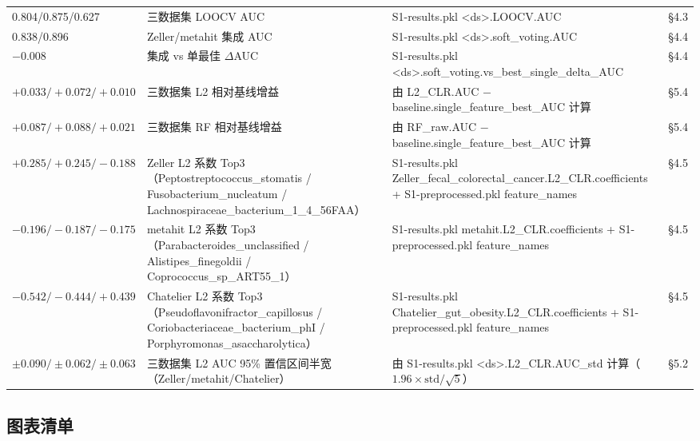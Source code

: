 \documentclass{article}
\begin{document}
\begin{center}
\begin{tabular}{llll}
0.804/0.875/0.627 & 三数据集 LOOCV AUC & S1-results.pkl <ds>.LOOCV.AUC & §4.3 \\
0.838/0.896 & Zeller/metahit 集成 AUC & S1-results.pkl <ds>.soft\_voting.AUC & §4.4 \\
$-0.008$ & 集成 vs 单最佳 $\Delta$AUC & S1-results.pkl <ds>.soft\_voting.vs\_best\_single\_delta\_AUC & §4.4 \\
$+0.033/+0.072/+0.010$ & 三数据集 L2 相对基线增益 & 由 L2\_CLR.AUC $-$ baseline.single\_feature\_best\_AUC 计算 & §5.4 \\
$+0.087/+0.088/+0.021$ & 三数据集 RF 相对基线增益 & 由 RF\_raw.AUC $-$ baseline.single\_feature\_best\_AUC 计算 & §5.4 \\
$+0.285/+0.245/-0.188$ & Zeller L2 系数 Top3（Peptostreptococcus\_stomatis / Fusobacterium\_nucleatum / Lachnospiraceae\_bacterium\_1\_4\_56FAA） & S1-results.pkl Zeller\_fecal\_colorectal\_cancer.L2\_CLR.coefficients + S1-preprocessed.pkl feature\_names & §4.5 \\
$-0.196/-0.187/-0.175$ & metahit L2 系数 Top3（Parabacteroides\_unclassified / Alistipes\_finegoldii / Coprococcus\_sp\_ART55\_1） & S1-results.pkl metahit.L2\_CLR.coefficients + S1-preprocessed.pkl feature\_names & §4.5 \\
$-0.542/-0.444/+0.439$ & Chatelier L2 系数 Top3（Pseudoflavonifractor\_capillosus / Coriobacteriaceae\_bacterium\_phI / Porphyromonas\_asaccharolytica） & S1-results.pkl Chatelier\_gut\_obesity.L2\_CLR.coefficients + S1-preprocessed.pkl feature\_names & §4.5 \\
$\pm0.090/\pm0.062/\pm0.063$ & 三数据集 L2 AUC 95\% 置信区间半宽（Zeller/metahit/Chatelier） & 由 S1-results.pkl <ds>.L2\_CLR.AUC\_std 计算（$1.96\times\mathrm{std}/\sqrt{5}$） & §5.2 \\
\bottomrule
\end{tabular}
\end{center}

\subsection{图表清单}
\end{document}
